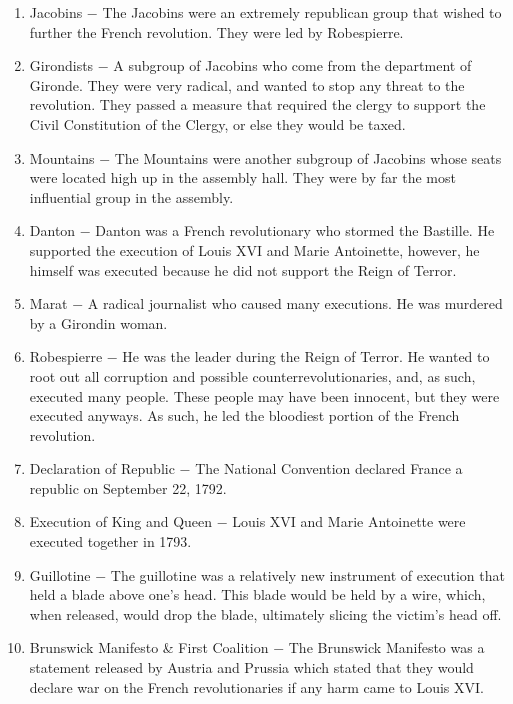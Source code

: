 \documentclass[12pt]{article}
\begin{document}
\begin{enumerate}
\item Jacobins $-$ The Jacobins were an extremely republican group that wished to further the French revolution. They were led by Robespierre.

\item Girondists $-$ A subgroup of Jacobins who come from the department of Gironde. They were very radical, and wanted to stop any threat to the revolution. They passed a measure that required the clergy to support the Civil Constitution of the Clergy, or else they would be taxed.

\item Mountains $-$ The Mountains were another subgroup of Jacobins whose seats were located high up in the assembly hall. They were by far the most influential group in the assembly.

\item Danton $-$ Danton was a French revolutionary who stormed the Bastille. He supported the execution of Louis XVI and Marie Antoinette, however, he himself was executed because he did not support the Reign of Terror.

\item Marat $-$ A radical journalist who caused many executions. He was murdered by a Girondin woman.

\item Robespierre $-$ He was the leader during the Reign of Terror. He wanted to root out all corruption and possible counterrevolutionaries, and, as such, executed many people. These people may have been innocent, but they were executed anyways. As such, he led the bloodiest portion of the French revolution.

\item Declaration of Republic $-$ The National Convention declared France a republic on September 22, 1792.

\item Execution of King and Queen $-$ Louis XVI and Marie Antoinette were executed together in 1793. 

\item Guillotine $-$ The guillotine was a relatively new instrument of execution that held a blade above one's head. This blade would be held by a wire, which, when released, would drop the blade, ultimately slicing the victim's head off.

\item Brunswick Manifesto \& First Coalition $-$ The Brunswick Manifesto was a statement released by Austria and Prussia which stated that they would declare war on the French revolutionaries if any harm came to Louis XVI.


\end{enumerate}
\end{document}
